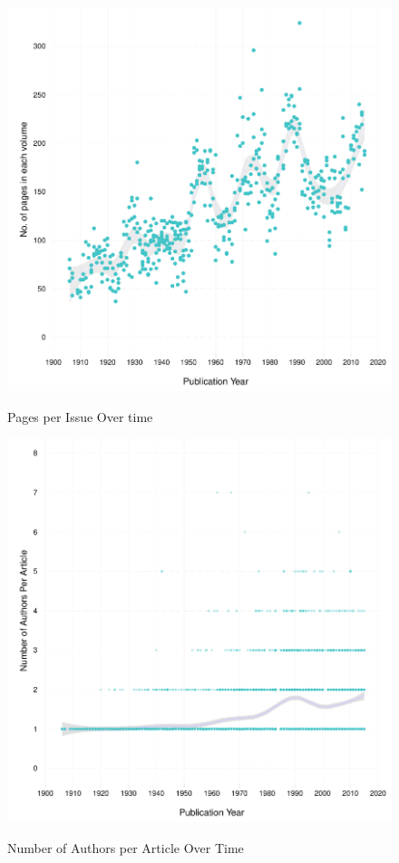 \documentclass[11pt]{article}
\begin{document}
\begin{figure}[htbp]
\centering
\caption{Pages per Issue Over time}
\includegraphics[scale=.85]{../figs/pages_per_issue_over_time.pdf}
\label{fig:issue}
\end{figure}

\begin{figure}[htbp]
\centering
\caption{Number of Authors per Article Over Time}
\includegraphics[scale=.85]{../figs/n_authors_per_article_over_time.pdf}
\label{fig:nauthors}
\end{figure}
\end{document}
